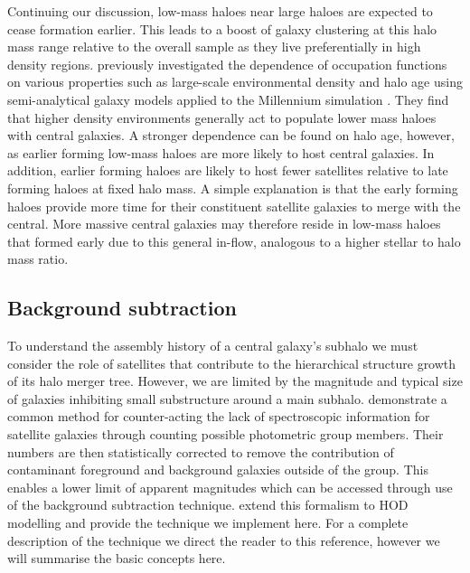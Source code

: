 Continuing our discussion, low-mass haloes near large haloes are expected to cease formation earlier. This leads to a boost of galaxy clustering at this halo mass range relative to the overall sample as they live preferentially in high density regions. \citet{zehavi2018} previously investigated the dependence of occupation functions on various properties such as large-scale environmental density and halo age using semi-analytical galaxy models applied to the Millennium simulation \citep{springel2005} \citep[See also;][who confirmed these results using the hydro simulations of EAGLE and Illustris]{artale2018}. They find that higher density environments generally act to populate lower mass haloes with central galaxies. A stronger dependence can be found on halo age, however, as earlier forming low-mass haloes are more likely to host central galaxies. In addition, earlier forming haloes are likely to host fewer satellites relative to late forming haloes at fixed halo mass. A simple explanation is that the early forming haloes provide more time for their constituent satellite galaxies to merge with the central. More massive central galaxies may therefore reside in low-mass haloes that formed early due to this general in-flow, analogous to a higher stellar to halo mass ratio. 

\subsection{Background subtraction}
To understand the assembly history of a central galaxy's subhalo we must consider the role of satellites that contribute to the hierarchical structure growth of its halo merger tree. However, we are limited by the magnitude and typical size of galaxies inhibiting small substructure around a main subhalo. \citet{liu2011} demonstrate a common method for counter-acting the lack of spectroscopic information for satellite galaxies through counting possible photometric group members. Their numbers are then statistically corrected to remove the contribution of contaminant foreground and background galaxies outside of the group. This enables a lower limit of apparent magnitudes which can be accessed through use of the background subtraction technique. \citet{rodriguez2015} extend this formalism to HOD modelling and provide the technique we implement here. For a complete description of the technique we direct the reader to this reference, however we will summarise the basic concepts here.

